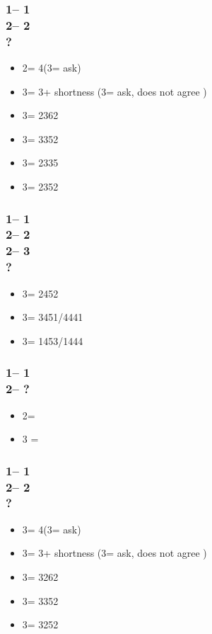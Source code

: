 \subsubsection*{1\diams -- 1\hearts\\
                2\hearts -- 2\spades\\
                ?}
\begin{itemize}
    \item 2\nt = 4\hearts (3\clubs = ask)
    \item 3\clubs = 3\hearts + shortness (3\diams = ask, does not agree \hearts)
    \item 3\diams = 2362
    \item 3\hearts = 3352
    \item 3\spades = 2335
    \item 3\nt = 2352
\end{itemize}

\subsubsection*{1\diams -- 1\hearts\\
                2\hearts -- 2\spades\\
                2\nt -- 3\clubs\\
                ?}
\begin{itemize}
    \item 3\diams = 2452
    \item 3\hearts = 3451/4441
    \item 3\spades = 1453/1444
\end{itemize}

\subsubsection*{1\diams -- 1\spades\\
                2\spades -- ?}
\begin{itemize}
    \item 2\nt = \gf
    \item 3 = \inv
\end{itemize}

\subsubsection*{1\diams -- 1\spades\\
                2\spades -- 2\nt\\
                ?}
\begin{itemize}
    \item 3\clubs = 4\spades (3\diams = ask)
    \item 3\diams = 3\spades + shortness (3\hearts = ask, does not agree \spades)
    \item 3\hearts = 3262
    \item 3\spades = 3352
    \item 3\nt = 3252
\end{itemize}

